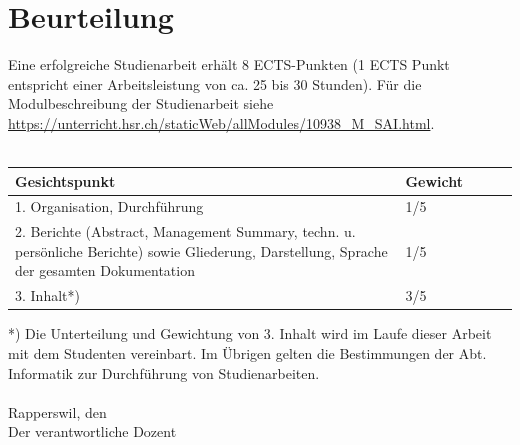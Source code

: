 \documentclass{article}
\begin{document}
\section{Beurteilung}
Eine erfolgreiche Studienarbeit erhält 8 ECTS-Punkten (1 ECTS Punkt entspricht einer Arbeitsleistung von ca. 25 bis 30 Stunden). Für die Modulbeschreibung der Studienarbeit siehe 
\url{https://unterricht.hsr.ch/staticWeb/allModules/10938_M_SAI.html}.\\ \\
\begin{tabular}{l p{3cm} l l l}
Gesichtspunkt & Gewicht \\ \hline
1. Organisation, Durchführung & 1/5 \\
2. Berichte (Abstract, Management Summary, techn. u. persönliche Berichte) sowie Gliederung, Darstellung, Sprache der gesamten Dokumentation & 1/5 \\
3. Inhalt*) & 3/5
\end{tabular}
*) Die Unterteilung und Gewichtung von 3. Inhalt wird im Laufe dieser Arbeit mit dem Studenten vereinbart. Im Übrigen gelten die Bestimmungen der Abt. Informatik zur Durchführung von Studienarbeiten.\\ \\
Rapperswil, den\\
Der verantwortliche Dozent\\
\end{document}
